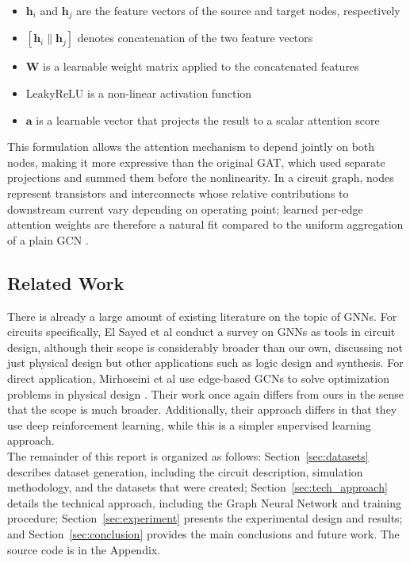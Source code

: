 \documentclass[10pt,twocolumn,letterpaper]{article}
\begin{document}
\begin{itemize}[nosep]
  \item $\mathbf{h}_i$ and $\mathbf{h}_j$ are the feature vectors of the source and target nodes, respectively
  \item $[\mathbf{h}_i \| \mathbf{h}_j]$ denotes concatenation of the two feature vectors
  \item $\mathbf{W}$ is a learnable weight matrix applied to the concatenated features
  \item $\mathrm{LeakyReLU}$ is a non-linear activation function
  \item $\mathbf{a}$ is a learnable vector that projects the result to a scalar attention score\\
\end{itemize}

This formulation allows the attention mechanism to depend jointly on both nodes, making it more expressive than the original GAT, which used separate projections and summed them before the nonlinearity. In a circuit graph, nodes represent transistors and interconnects whose relative contributions to downstream current vary depending on operating point; learned per-edge attention weights are therefore a natural fit compared to the uniform aggregation of a plain GCN \cite{DBLP:journals/corr/KipfW16}.

\subsection{Related Work}
\label{subsec:related_work}

There is already a large amount of existing literature on the topic of GNNs. For circuits specifically, El Sayed et al \cite{10.1145/3769081} conduct a survey on GNNs as tools in circuit design, although their scope is considerably broader than our own, discussing not just physical design but other applications such as logic design and synthesis. For direct application, Mirhoseini et al use edge-based GCNs to solve optimization problems in physical design \cite{Mirhoseini2021}. Their work once again differs from ours in the sense that the scope is much broader. Additionally, their approach differs in that they use deep reinforcement learning, while this is a simpler supervised learning approach.\\

The remainder of this report is organized as follows: Section~\ref{sec:datasets} describes dataset generation, including the circuit description, simulation methodology, and the datasets that were created; Section~\ref{sec:tech_approach} details the technical approach, including the Graph Neural Network and training procedure; Section~\ref{sec:experiment} presents the experimental design and results; and Section~\ref{sec:conclusion} provides the main conclusions and future work. The source code is in the Appendix.
\end{document}
